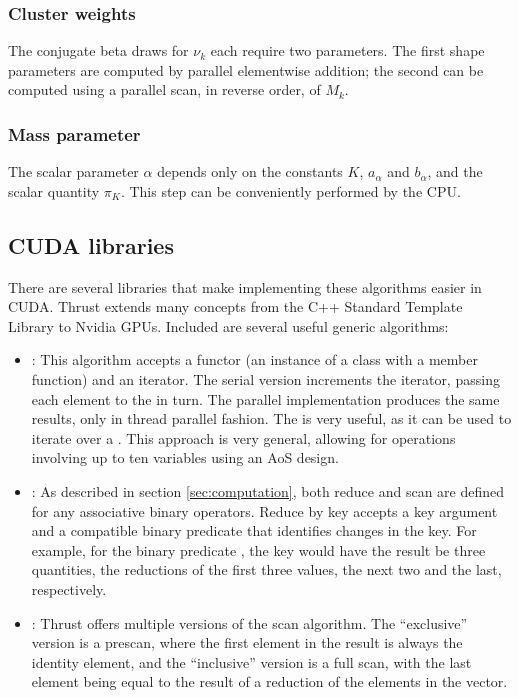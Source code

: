 \subsubsection{Cluster weights}

The conjugate beta draws for $\nu_k$ each require two parameters. The
first shape parameters are computed by parallel elementwise addition;
the second can be computed using a parallel scan, in reverse order, of $M_k$.

\subsubsection{Mass parameter}

The scalar parameter $\alpha$ depends only on the constants $K$, $a_\alpha$ and $b_\alpha$, and the scalar quantity $\pi_K$. This step can be conveniently performed by the CPU.

\subsection{CUDA libraries}
There are several libraries that make implementing these algorithms easier in CUDA. Thrust \cite{thrust} extends many concepts from the C++ Standard Template Library to Nvidia GPUs. Included are several useful generic algorithms:
\begin{itemize}
\item {}: This algorithm accepts a functor (an
  instance of a class with a member  function)
  and an iterator. The serial version increments the iterator, passing
  each element to the  in turn. The parallel implementation
  produces the same results, only in thread parallel fashion. The
   is very useful, as it can be used
  to iterate
  over a . This approach is very general, allowing
  for operations involving up to ten variables using an AoS
  design.

\item {}: As described in section
  \ref{sec:computation}, both reduce and scan are defined for any associative binary operators. Reduce by key accepts a key argument and a compatible binary predicate that identifies changes in the key. For example, for the binary predicate , the key  would have the result be three quantities, the reductions of the first three values, the next two and the last, respectively.

\item {}: Thrust
  offers multiple versions of the scan algorithm. The ``exclusive''
  version is a prescan, where the first element in the result is
  always the identity element, and the ``inclusive'' version is a full
  scan, with the last element being equal to the result of a reduction
  of the elements in the vector.
\end{itemize}

